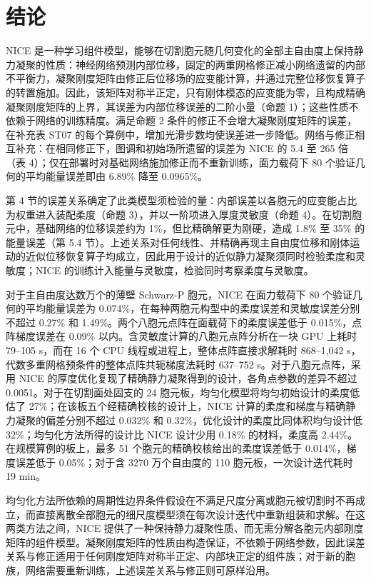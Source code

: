 \documentclass[preprint,12pt,authoryear]{elsarticle}
\begin{document}
\section{结论}

NICE 是一种学习组件模型，能够在切割胞元随几何变化的全部主自由度上保持静力凝聚的性质：神经网络预测内部位移，固定的两重网格修正减小网络遗留的内部不平衡力，凝聚刚度矩阵由修正后位移场的应变能计算，并通过完整位移恢复算子的转置施加。因此，该矩阵对称半正定，只有刚体模态的应变能为零，且构成精确凝聚刚度矩阵的上界，其误差为内部位移误差的二阶小量（命题 1）；这些性质不依赖于网络的训练精度。满足命题 2 条件的修正不会增大凝聚刚度矩阵的误差，在补充表 ST07 的每个算例中，增加光滑步数均使误差进一步降低。网络与修正相互补充：在相同修正下，图调和初始场所遗留的误差为 NICE 的 5.4 至 265 倍（表 4）；仅在部署时对基础网络施加修正而不重新训练，面力载荷下 80 个验证几何的平均能量误差即由 6.89\% 降至 0.0965\%。

第 4 节的误差关系确定了此类模型须检验的量：内部误差以各胞元的应变能占比为权重进入装配柔度（命题 3），并以一阶项进入厚度灵敏度（命题 4）。在切割胞元中，基础网络的位移误差约为 1\%，但比精确解更为刚硬，造成 1.8\% 至 35\% 的能量误差（第 5.4 节）。上述关系对任何线性、并精确再现主自由度位移和刚体运动的近似位移恢复算子均成立，因此用于设计的近似静力凝聚须同时检验柔度和灵敏度；NICE 的训练计入能量与灵敏度，检验同时考察柔度与灵敏度。

对于主自由度达数万个的薄壁 Schwarz-P 胞元，NICE 在面力载荷下 80 个验证几何的平均能量误差为 0.074\%，在每种两胞元构型中的柔度误差和灵敏度误差分别不超过 0.27\% 和 1.49\%。两个八胞元点阵在面载荷下的柔度误差低于 0.015\%，点阵梯度误差在 0.09\% 以内。含灵敏度计算的八胞元点阵分析在一块 GPU 上耗时 79--105 s，而在 16 个 CPU 线程或进程上，整体点阵直接求解耗时 868--1,042 s，代数多重网格预条件的整体点阵共轭梯度法耗时 637--752 s。对于八胞元点阵，采用 NICE 的厚度优化复现了精确静力凝聚得到的设计，各角点参数的差异不超过 0.0051。对于在切割面处固支的 24 胞元板，均匀化模型将均匀初始设计的柔度低估了 27\%；在该板五个经精确校核的设计上，NICE 计算的柔度和梯度与精确静力凝聚的偏差分别不超过 0.032\% 和 0.32\%，优化设计的柔度比同体积均匀设计低 32\%；均匀化方法所得的设计比 NICE 设计少用 0.18\% 的材料，柔度高 2.44\%。在规模算例的板上，最多 51 个胞元的精确校核给出的柔度误差低于 0.014\%，梯度误差低于 0.05\%；对于含 3270 万个自由度的 110 胞元板，一次设计迭代耗时 19 min。

均匀化方法所依赖的周期性边界条件假设在不满足尺度分离或胞元被切割时不再成立，而直接离散全部胞元的细尺度模型须在每次设计迭代中重新组装和求解。在这两类方法之间，NICE 提供了一种保持静力凝聚性质、而无需分解各胞元内部刚度矩阵的组件模型。凝聚刚度矩阵的性质由构造保证，不依赖于网络参数，因此误差关系与修正适用于任何刚度矩阵对称半正定、内部块正定的组件族；对于新的胞族，网络需要重新训练，上述误差关系与修正则可原样沿用。
\end{document}
